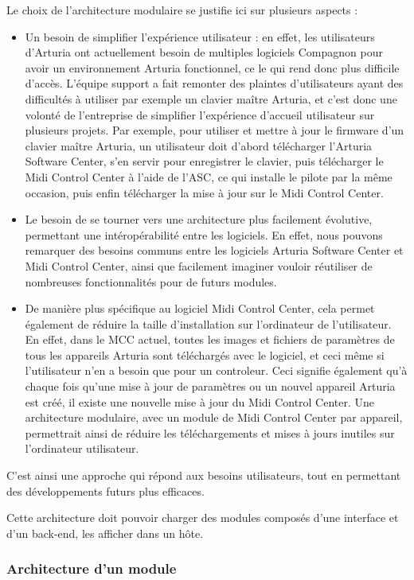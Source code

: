 \documentclass[francais]{rapportPFE}  %
\begin{document}
Le choix de l'architecture modulaire se justifie ici sur plusieurs aspects : 
\begin{itemize}
    \item Un besoin de simplifier l'expérience utilisateur : en effet, les utilisateurs d'Arturia ont actuellement besoin de multiples logiciels Compagnon pour avoir un environnement Arturia fonctionnel, ce le qui rend donc plus difficile d'accès. L'équipe support a fait remonter des plaintes d'utilisateurs ayant des difficultés à utiliser par exemple un clavier maître Arturia, et c'est donc une volonté de l'entreprise de simplifier l'expérience d'accueil utilisateur sur plusieurs projets. Par exemple, pour utiliser et mettre à jour le firmware d'un clavier maître Arturia, un utilisateur doit d'abord télécharger l'Arturia Software Center, s'en servir pour enregistrer le clavier, puis télécharger le Midi Control Center à l'aide de l'ASC, ce qui installe le pilote par la même occasion, puis enfin télécharger la mise à jour sur le Midi Control Center.
    \item Le besoin de se tourner vers une architecture plus facilement évolutive, permettant une intéropérabilité entre les logiciels. En effet, nous pouvons remarquer des besoins communs entre les logiciels Arturia Software Center et Midi Control Center, ainsi que facilement imaginer vouloir réutiliser de nombreuses fonctionnalités pour de futurs modules.
    \item De manière plus spécifique au logiciel Midi Control Center, cela permet également de réduire la taille d'installation sur l'ordinateur de l'utilisateur. En effet, dans le MCC actuel, toutes les images et fichiers de paramètres de tous les appareils Arturia sont téléchargés avec le logiciel, et ceci même si l'utilisateur n'en a besoin que pour un controleur. Ceci signifie également qu'à chaque fois qu'une mise à jour de paramètres ou un nouvel appareil Arturia est créé, il existe une nouvelle mise à jour du Midi Control Center. Une architecture modulaire, avec un module de Midi Control Center par appareil, permettrait ainsi de réduire les téléchargements et mises à jours inutiles sur l'ordinateur utilisateur.
\end{itemize}
C'est ainsi une approche qui répond aux besoins utilisateurs, tout en permettant des développements futurs plus efficaces.

Cette architecture doit pouvoir charger des modules composés d'une interface et d'un back-end, les afficher dans un hôte.

\subsubsection{Architecture d'un module}
\end{document}

